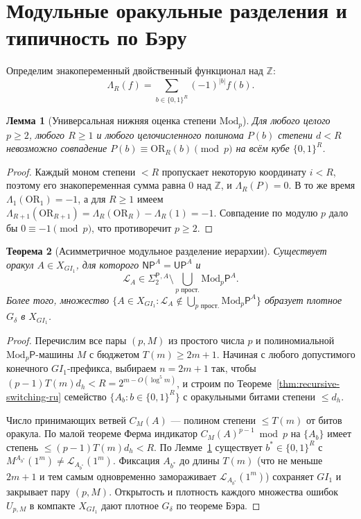 \documentclass[11pt,a4paper]{article}
\newtheorem{theorem}{Теорема}[section]
\newtheorem{lemma}[theorem]{Лемма}
\theoremstyle{definition}
\theoremstyle{remark}
\newcommand{\NP}{\mathsf{NP}}
\newcommand{\UP}{\mathsf{UP}}
\newcommand{\Modp}{\mathrm{Mod}_p\mathsf{P}}
\newcommand{\SigTwo}{\Sigma_2^{\mathsf{P}}}
\newcommand{\OR}{\mathrm{OR}}
\newcommand{\Z}{\mathbb{Z}}
\newcommand{\GI}{GI_1}
\begin{document}
\section{Модульные оракульные разделения и типичность по Бэру}

Определим знакопеременный двойственный функционал над $\Z$:
\[
  \Lambda_R(f) = \sum_{b \in \{0,1\}^R} (-1)^{|b|} f(b).
\]

\begin{lemma}[Универсальная нижняя оценка степени $\mathrm{Mod}_p$]
\label{lem:modp-lb-ru}
Для любого целого $p \ge 2$, любого $R \ge 1$ и любого целочисленного полинома $P(b)$ степени $d < R$ невозможно совпадение $P(b) \equiv \OR_R(b) \pmod p$ на всём кубе $\{0,1\}^R$.
\end{lemma}

\begin{proof}
Каждый моном степени $< R$ пропускает некоторую координату $i < R$, поэтому его знакопеременная сумма равна $0$ над $\Z$, и $\Lambda_R(P) = 0$. В то же время $\Lambda_1(\OR_1) = -1$, а для $R \ge 1$ имеем $\Lambda_{R+1}(\OR_{R+1}) = \Lambda_R(\OR_R) - \Lambda_R(1) = -1$. Совпадение по модулю $p$ дало бы $0 \equiv -1 \pmod p$, что противоречит $p \ge 2$.
\end{proof}

\begin{theorem}[Асимметричное модульное разделение иерархии]
\label{thm:main-sep-ru}
Существует оракул $A \in X_{\GI}$, для которого $\NP^A = \UP^A$ и
\[
  \mathcal{L}_A \in \SigTwo{}^{,A} \setminus \bigcup_{p\text{ прост.}} \Modp^A.
\]
Более того, множество $\{A \in X_{\GI} : \mathcal{L}_A \notin \bigcup_{p\text{ прост.}} \Modp^A\}$ образует плотное $G_\delta$ в $X_{\GI}$.
\end{theorem}

\begin{proof}
Перечислим все пары $(p, M)$ из простого числа $p$ и полиномиальной $\Modp$-машины $M$ с бюджетом $T(m) \ge 2m + 1$. Начиная с любого допустимого конечного $\GI$-префикса, выбираем $n = 2m+1$ так, чтобы $(p-1)T(m)d_h < R = 2^{m - O(\log^5 m)}$, и строим по Теореме~\ref{thm:recursive-switching-ru} семейство $\{A_b : b \in \{0,1\}^R\}$ с оракульными битами степени $\le d_h$.

Число принимающих ветвей $C_M(A)$ — полином степени $\le T(m)$ от битов оракула. По малой теореме Ферма индикатор $C_M(A)^{p-1} \bmod p$ на $\{A_b\}$ имеет степень $\le (p-1)T(m)d_h < R$. По Лемме~\ref{lem:modp-lb-ru} существует $b^* \in \{0,1\}^R$ с $M^{A_{b^*}}(1^m) \ne \mathcal{L}_{A_{b^*}}(1^m)$. Фиксация $A_{b^*}$ до длины $T(m)$ (что не меньше $2m+1$ и тем самым одновременно замораживает $\mathcal{L}_{A_{b^*}}(1^m)$) сохраняет $\GI$ и закрывает пару $(p, M)$. Открытость и плотность каждого множества ошибок $U_{p,M}$ в компакте $X_{\GI}$ дают плотное $G_\delta$ по теореме Бэра.
\end{proof}
\end{document}
